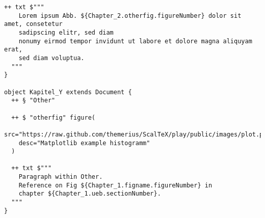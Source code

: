 \begin{lstlisting}[caption=Ausführliches Scala DSL Dokument-Skript.]
  ++ txt $"""
    Lorem ipsum Abb. ${Chapter_2.otherfig.figureNumber} dolor sit amet, consetetur
    sadipscing elitr, sed diam
    nonumy eirmod tempor invidunt ut labore et dolore magna aliquyam erat,
    sed diam voluptua.
  """
}

object Kapitel_Y extends Document {
  ++ § "Other"

  ++ $ "otherfig" figure(
    src="https://raw.github.com/themerius/ScalTeX/play/public/images/plot.png",
    desc="Matplotlib example histogramm"
  )

  ++ txt $"""
    Paragraph within Other.
    Reference on Fig ${Chapter_1.figname.figureNumber} in
    chapter ${Chapter_1.ueb.sectionNumber}.
  """
}
\end{lstlisting}